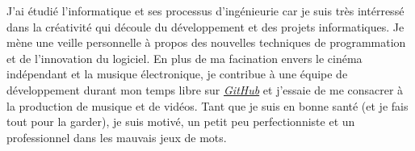 J'ai étudié l'informatique et ses processus d'ingénieurie car je suis très intérressé dans la créativité qui découle du développement et des projets informatiques. Je mène une veille personnelle à propos des nouvelles techniques de programmation et de l'innovation du logiciel.
En plus de ma facination envers le cinéma indépendant et la musique électronique, je contribue à une équipe de développement durant mon temps libre sur \href{https://github.com/team-chiru}{\textit{GitHub}} et j'essaie de me consacrer à la production de musique et de vidéos.
Tant que je suis en bonne santé (et je fais tout pour la garder), je suis motivé, un petit peu perfectionniste et un professionnel dans les mauvais jeux de mots.
\vspace{.25em}
